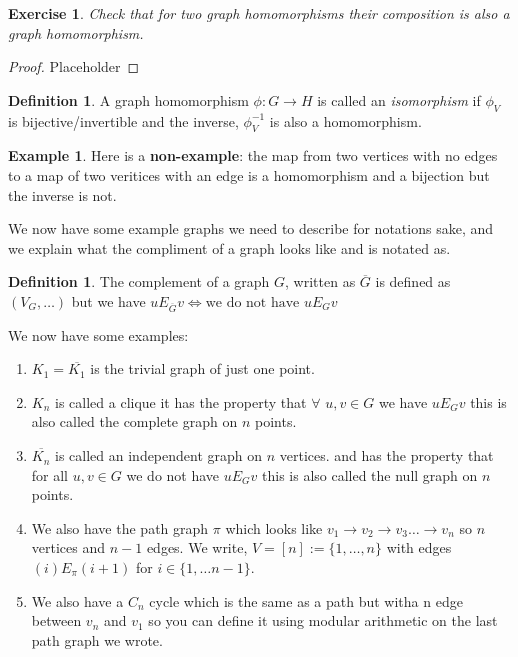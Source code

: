 \documentclass[11pt,a4paper]{article}
\theoremstyle{plain}
\newtheorem{exercise}[theorem]{Exercise}
\theoremstyle{definition}
\newtheorem{definition}[theorem]{Definition}
\newtheorem{example}[theorem]{Example}
\theoremstyle{remark}
\begin{document}
\begin{exercise}
    Check that for two graph homomorphisms their composition is also a graph homomorphism. 
\end{exercise}

\begin{proof}
    Placeholder
\end{proof}

\begin{definition}
    A graph homomorphism $\phi : G \to H$ is called an \emph{isomorphism} if $\phi_V$ is bijective/invertible and the inverse, $\phi_V^{-1}$ is also a homomorphism.
\end{definition}

\begin{example}
    Here is a \textbf{non-example}: the map from two vertices with no edges to a map of two veritices with an edge is a homomorphism and a bijection but the inverse is not. 
\end{example}

\noindent
We now have some example graphs we need to describe for notations sake, and we explain what the compliment of a graph looks like and is notated as. 

\begin{definition}
    The complement of a graph $G$, written as $\overline{G}$ is defined as $(V_G, \dots)$ but we have $uE_{\overline{G}}v \iff \text{we do not have } uE_G v$ 
\end{definition}

\noindent
We now have some examples:

\begin{enumerate}
    \item $K_1 = \overline{K_1}$ is the trivial graph of just one point. 
    \item $K_n$ is called a clique it has the property that $\forall$ $u, v \in G$ we have $uE_Gv$ this is also called the complete graph on $n$ points.
    \item $\overline{K_n}$ is called an independent graph on $n$ vertices. and has the property that for all $u,v \in G$ we do not have $uE_Gv$ this is also called the null graph on $n$ points.
    \item We also have the path graph $\pi$ which looks like $v_1 \to v_2 \to v_3 \dots \to v_n$ so $n$ vertices and $n-1$ edges. We write, $V = [n] := \{1,\dots,n\}$ with edges $(i)E_\pi(i+1)$ for $i \in \{1, \dots n-1\}$.
    \item We also have a $C_n$ cycle which is the same as a path but witha n edge between $v_n$ and $v_1$ so you can define it using modular arithmetic on the last path graph we wrote.
\end{enumerate}
\end{document}
